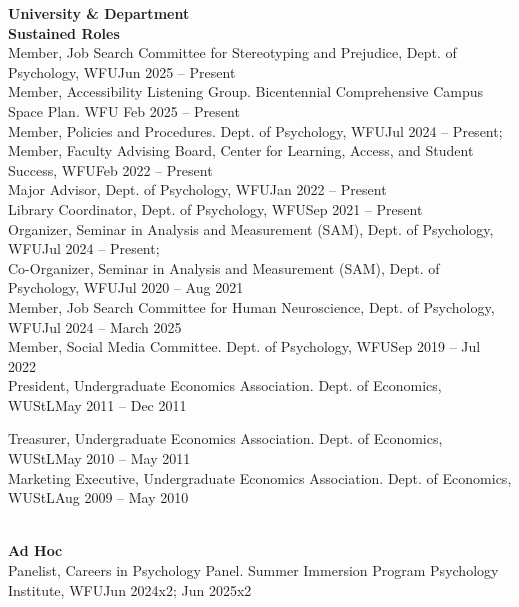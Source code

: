 {\large \textbf{University \& Department}}\\
\textrm{\textbf{Sustained Roles}}\\
Member, Job Search Committee for Stereotyping and Prejudice, Dept. of Psychology, WFU\hfill {Jun 2025 – Present}\\
Member, Accessibility Listening Group. \small{Bicentennial Comprehensive Campus Space Plan}. WFU \hfill{Feb 2025 – Present}\\ %
Member, Policies and Procedures. Dept. of Psychology, WFU\hfill{Jul 2024 – Present;}\newline 
{}\\
Member, Faculty Advising Board, Center for Learning, Access, and Student Success, WFU\hfill {Feb 2022 – Present}\\
Major Advisor, Dept. of Psychology, WFU\hfill{Jan 2022 – Present}\\
Library Coordinator, Dept. of Psychology, WFU\hfill {Sep 2021 – Present}\\
Organizer, Seminar in Analysis and Measurement (SAM), Dept. of Psychology, WFU\hfill{Jul 2024 – Present;}\newline 
{}\\
Co-Organizer, Seminar in Analysis and Measurement (SAM), Dept. of Psychology, WFU\hfill {Jul 2020 – Aug 2021}\\
Member, Job Search Committee for Human Neuroscience, Dept. of Psychology, WFU\hfill {Jul 2024 – March 2025}\\
Member, Social Media Committee. Dept. of Psychology, WFU\hfill {Sep 2019 – Jul 2022}\\
President, Undergraduate Economics Association. Dept. of Economics, WUStL\hfill{May 2011 – Dec 2011}\\
\begin{minipage}{\linewidth}\vspace{1.1mm} Treasurer, Undergraduate Economics Association. Dept. of Economics, WUStL\hfill{May 2010 – May 2011}\\
Marketing Executive, Undergraduate Economics Association. Dept. of Economics, WUStL\hfill {Aug 2009 – May 2010}\end{minipage}\medskip\\
\textrm{\textbf{Ad Hoc}}\\
Panelist, Careers in Psychology Panel. Summer Immersion Program Psychology Institute, WFU\hfill {Jun 2024x2; Jun 2025x2}\\ %
